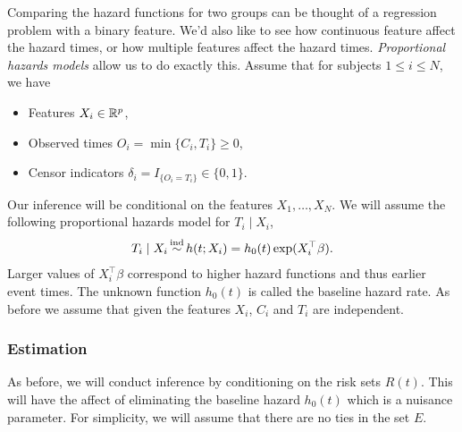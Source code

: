 Comparing the hazard functions for two groups can be thought of a regression problem with a binary feature. We'd also like to see how continuous feature affect the hazard times, or how multiple features affect the hazard times. \emph{Proportional hazards models} allow us to do exactly this. Assume that for subjects $1 \le i \le N$, we have
\begin{itemize}
    \item Features $X_i \in \mathbb{R}^p$,
    \item Observed times $O_i = \min\{C_i,T_i\} \ge 0$,
    \item Censor indicators $\delta_i = I_{\{O_i = T_i\}} \in \{0,1\}$.
\end{itemize}
Our inference will be conditional on the features $X_1,\ldots,X_N$. We will assume the following proportional hazards model for $T_i \mid X_i$,
\begin{align}
    T_i\mid X_i \simind h(t;X_i) = h_0(t)\exp(X_i^\top \beta). \label{eq:prop-haz}
\end{align}
Larger values of $X_i^\top \beta$ correspond to higher hazard functions and thus earlier event times. The unknown function $h_0(t)$ is called the baseline hazard rate.
As before we assume that given the features $X_i$, $C_i$ and $T_i$ are independent. 

\subsubsection*{Estimation}

As before, we will conduct inference by conditioning on the risk sets $R(t)$. This will have the affect of eliminating the baseline hazard $h_0(t)$ which is a nuisance parameter. For simplicity, we will assume that there are no ties in the set $E$.

